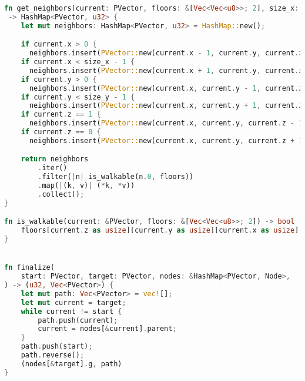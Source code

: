 \begin{lstlisting}[language=Rust, style=colouredRust]
fn get_neighbors(current: PVector, floors: &[Vec<Vec<u8>>; 2], size_x: u32, size_y: u32)
 -> HashMap<PVector, u32> {
    let mut neighbors: HashMap<PVector, u32> = HashMap::new();

    if current.x > 0 {
      neighbors.insert(PVector::new(current.x - 1, current.y, current.z), 1);}
    if current.x < size_x - 1 {
      neighbors.insert(PVector::new(current.x + 1, current.y, current.z), 1);}
    if current.y > 0 {
      neighbors.insert(PVector::new(current.x, current.y - 1, current.z), 1);}
    if current.y < size_y - 1 {
      neighbors.insert(PVector::new(current.x, current.y + 1, current.z), 1);}
    if current.z == 1 {
      neighbors.insert(PVector::new(current.x, current.y, current.z - 1), 3);}
    if current.z == 0 {
      neighbors.insert(PVector::new(current.x, current.y, current.z + 1), 3);}

    return neighbors
        .iter()
        .filter(|n| is_walkable(n.0, floors))
        .map(|(k, v)| (*k, *v))
        .collect();
}

fn is_walkable(current: &PVector, floors: &[Vec<Vec<u8>>; 2]) -> bool {
    floors[current.z as usize][current.y as usize][current.x as usize] != 0
}


fn finalize(
    start: PVector, target: PVector, nodes: &HashMap<PVector, Node>,
) -> (u32, Vec<PVector>) {
    let mut path: Vec<PVector> = vec![];
    let mut current = target;
    while current != start {
        path.push(current);
        current = nodes[&current].parent;
    }
    path.push(start);
    path.reverse();
    (nodes[&target].g, path)
}

\end{lstlisting}

